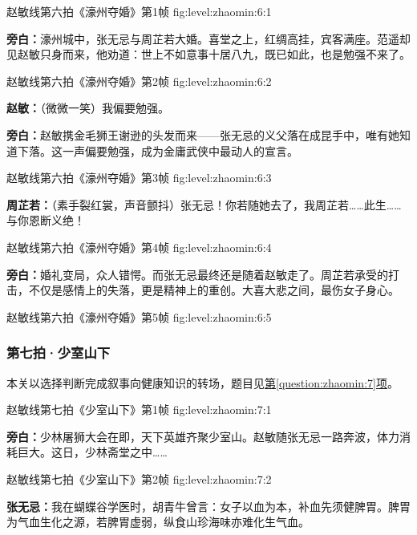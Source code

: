   {赵敏线第六拍《濠州夺婚》第1帧}
  {fig:level:zhaomin:6:1}
  {\scriptsize}
  {\textbf{旁白：}濠州城中，张无忌与周芷若大婚。喜堂之上，红绸高挂，宾客满座。范遥却见赵敏只身而来，他劝道：世上不如意事十居八九，既已如此，也是勉强不来了。\par}

  {赵敏线第六拍《濠州夺婚》第2帧}
  {fig:level:zhaomin:6:2}
  {\scriptsize}
  {\textbf{赵敏：}（微微一笑）我偏要勉强。\par
\textbf{旁白：}赵敏携金毛狮王谢逊的头发而来——张无忌的义父落在成昆手中，唯有她知道下落。这一声偏要勉强，成为金庸武侠中最动人的宣言。\par}

\clearpage

  {赵敏线第六拍《濠州夺婚》第3帧}
  {fig:level:zhaomin:6:3}
  {\scriptsize}
  {\textbf{周芷若：}（素手裂红裳，声音颤抖）张无忌！你若随她去了，我周芷若……此生……与你恩断义绝！\par}

  {赵敏线第六拍《濠州夺婚》第4帧}
  {fig:level:zhaomin:6:4}
  {\scriptsize}
  {\textbf{旁白：}婚礼变局，众人错愕。而张无忌最终还是随着赵敏走了。周芷若承受的打击，不仅是感情上的失落，更是精神上的重创。大喜大悲之间，最伤女子身心。\par}

  {赵敏线第六拍《濠州夺婚》第5帧}
  {fig:level:zhaomin:6:5}
  {\scriptsize}
  {\mbox{}}

\clearpage

\subsubsection{第七拍·少室山下}\label{plot:zhaomin:7}
本关以选择判断完成叙事向健康知识的转场，题目见\hyperref[question:zhaomin:7]{第\ref*{question:zhaomin:7}项}。

  {赵敏线第七拍《少室山下》第1帧}
  {fig:level:zhaomin:7:1}
  {\scriptsize}
  {\textbf{旁白：}少林屠狮大会在即，天下英雄齐聚少室山。赵敏随张无忌一路奔波，体力消耗巨大。这日，少林斋堂之中……\par}

  {赵敏线第七拍《少室山下》第2帧}
  {fig:level:zhaomin:7:2}
  {\scriptsize}
  {\textbf{张无忌：}我在蝴蝶谷学医时，胡青牛曾言：女子以血为本，补血先须健脾胃。脾胃为气血生化之源，若脾胃虚弱，纵食山珍海味亦难化生气血。\par}

